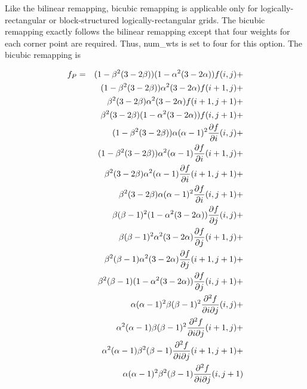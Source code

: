      Like the bilinear remapping, bicubic remapping is applicable
     only for logically-rectangular or block-structured logically-rectangular
     grids.  The bicubic remapping exactly follows the bilinear remapping except
     that four weights for each corner point are required.  Thus, num\_wts
     is set to four for this option.  The bicubic remapping is

\begin{eqnarray}\label{eq:bicubic}
f_P & = & 
    (1 - \beta^2(3-2\beta))(1 - \alpha^2(3-2\alpha))f(i  ,j  ) + \nonumber \\
& & (1 - \beta^2(3-2\beta))     \alpha^2(3-2\alpha) f(i+1,j  ) + \nonumber \\
& &      \beta^2(3-2\beta)      \alpha^2(3-2\alpha) f(i+1,j+1) + \nonumber \\
& &      \beta^2(3-2\beta) (1 - \alpha^2(3-2\alpha))f(i  ,j+1) + \nonumber \\
& & (1 - \beta^2(3-2\beta))\alpha  (\alpha-1)^2 
                        {{\partial f}\over{\partial i}}(i  ,j  ) + \nonumber \\
& & (1 - \beta^2(3-2\beta))\alpha^2(\alpha-1) 
                        {{\partial f}\over{\partial i}}(i+1,j  ) + \nonumber \\
& &      \beta^2(3-2\beta) \alpha^2(\alpha-1)
                        {{\partial f}\over{\partial i}}(i+1,j+1) + \nonumber \\
& &      \beta^2(3-2\beta) \alpha  (\alpha-1)^2 
                        {{\partial f}\over{\partial i}}(i  ,j+1) + \nonumber \\
& & \beta  (\beta-1)^2(1 - \alpha^2(3-2\alpha))
                        {{\partial f}\over{\partial j}}(i  ,j  ) + \nonumber \\
& & \beta  (\beta-1)^2     \alpha^2(3-2\alpha) 
                        {{\partial f}\over{\partial j}}(i+1,j  ) + \nonumber \\
& & \beta^2(\beta-1)       \alpha^2(3-2\alpha)
                        {{\partial f}\over{\partial j}}(i+1,j+1) + \nonumber \\
& & \beta^2(\beta-1)  (1 - \alpha^2(3-2\alpha)) 
                        {{\partial f}\over{\partial j}}(i  ,j+1) + \nonumber \\
& & \alpha  (\alpha-1)^2\beta  (\beta-1)^2
           {{\partial^2 f}\over{\partial i \partial j}}(i  ,j  ) + \nonumber \\
& & \alpha^2(\alpha-1)  \beta  (\beta-1)^2 
           {{\partial^2 f}\over{\partial i \partial j}}(i+1,j  ) + \nonumber \\
& & \alpha^2(\alpha-1)  \beta^2(\beta-1)
           {{\partial^2 f}\over{\partial i \partial j}}(i+1,j+1) + \nonumber \\
& & \alpha  (\alpha-1)^2\beta^2(\beta-1)
           {{\partial^2 f}\over{\partial i \partial j}}(i  ,j+1)
\end{eqnarray}

